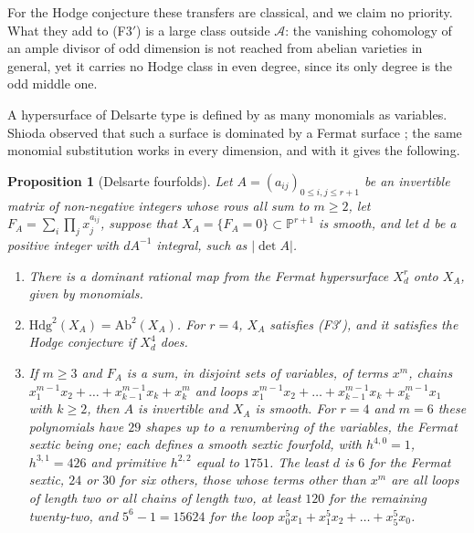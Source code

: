 \documentclass[11pt,reqno]{amsart}
\theoremstyle{plain}
\newtheorem{proposition}[theorem]{Proposition}
\theoremstyle{definition}
\theoremstyle{remark}
\newcommand{\PP}{\mathbb{P}}
\newcommand{\Hdg}{\mathrm{Hdg}}
\begin{document}
For the Hodge conjecture these transfers are classical, and we claim no
priority. What they add to \textup{(F3$'$)} is a large class outside
$\mathcal{A}$: the vanishing cohomology of an ample divisor of odd dimension
is not reached from abelian varieties in general, yet it carries no Hodge
class in even degree, since its only degree is the odd middle one.

A hypersurface of Delsarte type is defined by as many monomials as
variables. Shioda observed that such a surface is dominated by a Fermat
surface \cite{Shi86}; the same monomial substitution works in every
dimension, and with  it gives the following.

\begin{proposition}[Delsarte fourfolds]\label{prop:delsarte}
Let $A=(a_{ij})_{0\le i,j\le r+1}$ be an invertible matrix of non-negative
integers whose rows all sum to $m\ge2$, let $F_{A}=\sum_{i}\prod_{j}
x_{j}^{a_{ij}}$, suppose that $X_{A}=\{F_{A}=0\}\subset\PP^{r+1}$ is smooth,
and let $d$ be a positive integer with $dA^{-1}$ integral, such as
$|\det A|$.
\begin{enumerate}[label=\textup{(\roman*)},leftmargin=2.6em,itemsep=2pt]
\item There is a dominant rational map from the Fermat hypersurface
  $X^{r}_{d}$ onto $X_{A}$, given by monomials.
\item $\Hdg^{2}(X_{A})=\mathrm{Ab}^{2}(X_{A})$. For $r=4$, $X_{A}$
  satisfies \textup{(F3$'$)}, and it satisfies the Hodge conjecture if
  $X^{4}_{d}$ does.
\item If $m\ge3$ and $F_{A}$ is a sum, in disjoint sets of variables, of
  terms $x^{m}$, chains $x_{1}^{m-1}x_{2}+\dots+x_{k-1}^{m-1}x_{k}+x_{k}^{m}$
  and loops $x_{1}^{m-1}x_{2}+\dots+x_{k-1}^{m-1}x_{k}+x_{k}^{m-1}x_{1}$
  with $k\ge2$, then $A$ is invertible and $X_{A}$ is smooth. For $r=4$ and
  $m=6$ these polynomials have $29$ shapes up to a renumbering of the
  variables, the Fermat sextic being one; each defines a smooth sextic
  fourfold, with $h^{4,0}=1$, $h^{3,1}=426$ and primitive $h^{2,2}$ equal
  to $1751$. The least $d$ is $6$ for the Fermat sextic, $24$ or $30$ for
  six others, those whose terms other than $x^{m}$ are all loops of length
  two or all chains of length two, at least $120$ for the remaining
  twenty-two, and $5^{6}-1=15624$ for the loop
  $x_{0}^{5}x_{1}+x_{1}^{5}x_{2}+\dots+x_{5}^{5}x_{0}$.
\end{enumerate}
\end{proposition}
\end{document}
